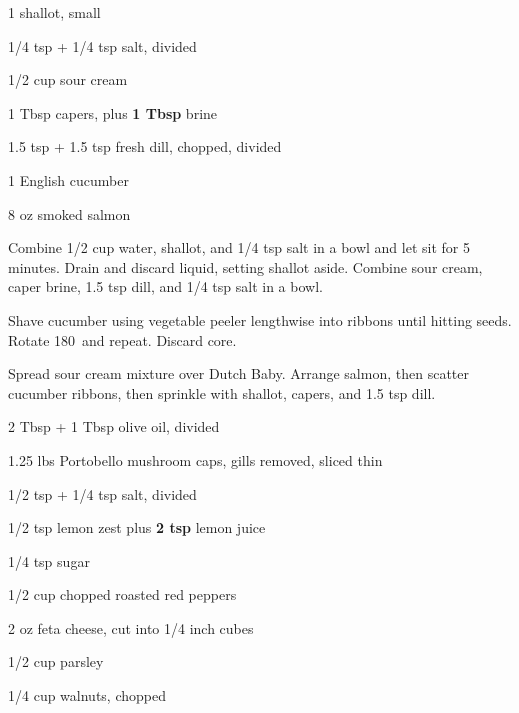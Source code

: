\documentclass[oneside]{book}  %
\begin{document}
\smallskip

\begin{twocols}
  \begin{ingredients}[title=Lox and Cucumber Ingredients]
    \item[1] shallot, small
    \item[1/4 tsp + 1/4 tsp] salt, divided
    \item[1/2 cup] sour cream
    \item[1 Tbsp] capers, plus \textbf{1 Tbsp} brine
    \item[1.5 tsp + 1.5 tsp] fresh dill, chopped, divided
    \item[1] English cucumber
    \item[8 oz] smoked salmon
  \end{ingredients}

  \begin{directions1col}
    \item Combine 1/2 cup water, shallot, and 1/4 tsp salt in a bowl and let sit
    for 5 minutes. Drain and discard liquid, setting shallot aside. Combine sour
    cream, caper brine, 1.5 tsp dill, and 1/4 tsp salt in a bowl.

    \item Shave cucumber using vegetable peeler lengthwise into ribbons until
    hitting seeds. Rotate 180\textdegree\ and repeat. Discard core.

    \item Spread sour cream mixture over Dutch Baby. Arrange salmon, then scatter
    cucumber ribbons, then sprinkle with shallot, capers, and 1.5 tsp dill.
  \end{directions1col}

  \columnbreak

  \begin{ingredients}[title=Mushroom and Red Pepper Ingredients]
    \item[2 Tbsp + 1 Tbsp] olive oil, divided
    \item[1.25 lbs] Portobello mushroom caps, gills removed, sliced thin
    \item[1/2 tsp + 1/4 tsp] salt, divided
    \item[1/2 tsp] lemon zest plus \textbf{2 tsp} lemon juice
    \item[1/4 tsp] sugar
    \item[1/2 cup] chopped roasted red peppers
    \item[2 oz] feta cheese, cut into 1/4 inch cubes
    \item[1/2 cup] parsley
    \item[1/4 cup] walnuts, chopped
  \end{ingredients}


\end{twocols}
\end{document}
